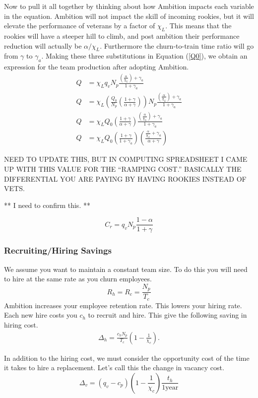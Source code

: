 \documentclass[paper=a4, fontsize=11pt abstract]{scrartcl}
\numberwithin{equation}{section}		%
\numberwithin{figure}{section}			%
\numberwithin{table}{section}				%
\begin{document}
Now to pull it all together by thinking about how Ambition impacts each variable in the equation.  Ambition will not impact the skill of incoming rookies, but it will elevate the performance of veterans by a factor of $\chi_L$.  This means that the rookies will have a steeper hill to climb, and post ambition their performance reduction will actually be $\alpha / \chi_L$.  Furthermore the churn-to-train time ratio will go from $\gamma$ to $\gamma_a$.  Making these three substitutions in Equation (\ref{Q0}), we obtain an expression for the team production after adopting Ambition.
\begin{align}
    Q &= \chi_L q_{v} N_p \frac{\left(\frac{\alpha}{\chi_L}\right) + \gamma_a}{1 + \gamma_a} \\
    Q &= \chi_L \left(     \frac{Q_0}{N_p}\left(\frac{1 + \gamma}{\alpha + \gamma}\right)             \right) N_p \frac{\left(\frac{\alpha}{\chi_L}\right) + \gamma_a}{1 + \gamma_a} \\
    Q &= \chi_L Q_0  \left(\frac{1 + \gamma}{\alpha + \gamma}  \right)  \frac{\left(\frac{\alpha}{\chi_L}\right) + \gamma_a}{1 + \gamma_a} \\
    Q &= \chi_L Q_0  \left(\frac{1+\gamma}{1 + \gamma_a}\right) \left(\frac{\frac{\alpha}{\chi_L} + \gamma_a  }{\alpha + \gamma}\right)
\end{align}

NEED TO UPDATE THIS, BUT IN COMPUTING SPREADSHEET I CAME UP WITH THIS VALUE FOR THE ``RAMPING COST.''
BASICALLY THE DIFFERENTIAL YOU ARE PAYING BY HAVING ROOKIES INSTEAD OF VETS.

** I need to confirm this. **

\begin{equation}
    C_r = q_v N_p \frac{1 - \alpha}{1 + \gamma}
\end{equation}

\subsubsection{Recruiting/Hiring Savings}
We assume you want to maintain a constant team size.
To do this you will need to hire at the same rate as you churn employees.
\begin{equation}
    R_h = R_c = \frac{N_p}{T_c} 
\end{equation}
Ambition increases your employee retention rate.  This lowers your hiring rate.
Each new hire costs you $c_h$ to recruit and hire.
This give the following saving in hiring cost.
\begin{align}
    \Delta_h = \frac{c_h N_p}{T_c}\left(1 - \frac{1}{\chi_c}\right).
\end{align}


In addition to the hiring cost, we must consider the opportunity cost of the time it takes to hire a replacement.  Let's call this the change in vacancy cost.
\begin{equation}
    \Delta_v = \left(q_v - c_p\right)\left(1-\frac{1}{\chi_c}\right)\frac{t_h}{1 \textrm{year}}
\end{equation}


\end{document}

